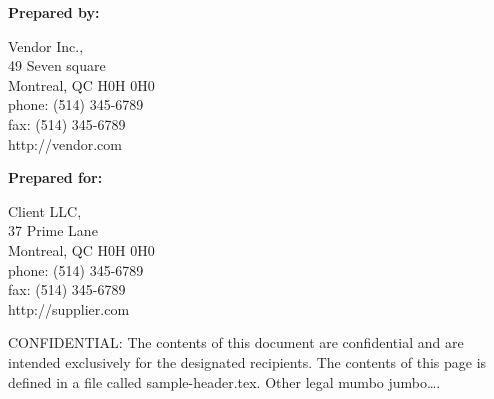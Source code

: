 \begin{titlingpage}
  \maketitle
  \vfill
\end{titlingpage}

\pagebreak

\textbf{Prepared by:}

Vendor Inc.,\\49 Seven square\\Montreal, QC H0H 0H0\\phone: (514)
345-6789\\fax: (514) 345-6789\\http://vendor.com

\textbf{}

\textbf{Prepared for:}

Client LLC,\\37 Prime Lane\\Montreal, QC H0H 0H0\\phone: (514)
345-6789\\fax: (514) 345-6789\\http://supplier.com

\vfill

CONFIDENTIAL: The contents of this document are confidential and are
intended exclusively for the designated recipients. The contents of this page
is defined in a file called sample-header.tex. Other legal mumbo jumbo\ldots{}.

\pagebreak

